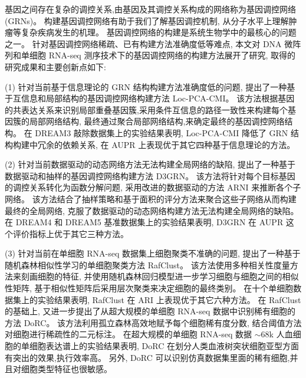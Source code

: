 \begin{abstractcn}\setlength{\baselineskip}{20pt}%

基因之间存在复杂的调控关系,由基因及其调控关系构成的网络称为基因调控网络 (GRNs)。
构建基因调控网络有助于我们了解基因调控机制,
从分子水平上理解肿瘤等复杂疾病发生的机理。
基因调控网络的构建是系统生物学中的最核心的问题之一。
针对基因调控网络稀疏、已有构建方法准确度低等难点, 
本文对 DNA 微阵列和单细胞 RNA-seq 测序技术下的基因调控网络的构建方法展开了研究,
取得的研究成果和主要创新点如下:

(1) 针对当前基于信息理论的 GRN 结构构建方法准确度低的问题,
提出了一种基于互信息和局部结构的基因调控网络构建方法 Loc-PCA-CMI。
该方法根据基因的共表达关系来识别局部重叠基因簇,采用条件互信息的路径一致性来构建每个基因簇的局部网络结构,
最终通过聚合局部网络结构,来确定最终的基因调控网络结构。
在 DREAM3 敲除数据集上的实验结果表明,
 Loc-PCA-CMI 降低了 GRN 结构构建中冗余的依赖关系,
在 AUPR 上表现优于其它四种基于信息理论的方法。

(2) 针对当前数据驱动的动态网络方法无法构建全局网络的缺陷,
提出了一种基于数据驱动和抽样的基因调控网络构建方法 D3GRN。
该方法将针对每个目标基因的调控关系转化为函数分解问题,
采用改进的数据驱动的方法 ARNI 来推断各个子网络。
该方法结合了抽样策略和基于面积的评分方法来聚合这些子网络从而构建最终的全局网络,
克服了数据驱动的动态网络构建方法无法构建全局网络的缺陷。
在 DREAM4 和 DREAM5 基准数据集上的实验结果表明,
 D3GRN 在 AUPR 这个评价指标上优于其它三种方法。

(3) 针对当前在单细胞 RNA-seq 数据集上细胞聚类不准确的问题,
提出了一种基于随机森林相似性学习的单细胞聚类方法 RafClust。
该方法使用多种相关性度量方法来刻画细胞的特征, 
并使用随机森林回归模型进一步学习细胞与细胞之间的相似性矩阵,
基于相似性矩阵后采用层次聚类来决定细胞的最终类别。
在十个单细胞数据集上的实验结果表明, RafClust 在 ARI 上表现优于其它六种方法。
在 RafClust 的基础上, 
又进一步提出了从超大规模的单细胞 RNA-seq 数据中识别稀有细胞的方法 DoRC。
该方法利用孤立森林高效地赋予每个细胞稀有度分数,
结合阈值方法对细胞进行稀疏性的二元标注。
在超大规模的单细胞 RNA-seq 数据 ${\sim}68$k 人血细胞的单细胞表达谱上的实验结果表明,
DoRC 在划分人类血液树突状细胞亚型方面有突出的效果,执行效率高。
另外, DoRC 可以识别仿真数据集里面的稀有细胞,并且对细胞类型特征也很敏感。


\end{abstractcn}
